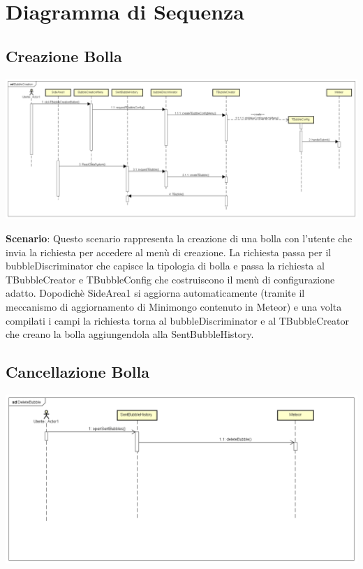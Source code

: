 \section{Diagramma di Sequenza}

\subsection{Creazione Bolla}


	\includegraphics[width=\textwidth]{img/CreationBubble.png}


\newpage

\textbf{Scenario}: 
Questo scenario rappresenta la creazione di una bolla con l’utente che
invia la richiesta per 	accedere al menù di creazione. La richiesta
passa per il bubbleDiscriminator che capisce la 	tipologia di bolla
e passa la richiesta al TBubbleCreator e TBubbleConfig che
costruiscono il 	menù di configurazione adatto.  
Dopodichè SideArea1 si aggiorna automaticamente (tramite il meccanismo di aggiornamento di Minimongo contenuto in Meteor) e
una volta compilati i campi la richiesta torna al bubbleDiscriminator e al TBubbleCreator che 	creano la bolla aggiungendola alla SentBubbleHistory. \\

\subsection{Cancellazione Bolla}

\begin{center}
	\includegraphics[scale=0.36]{img/DeleteBubble.png}
\end{center}



